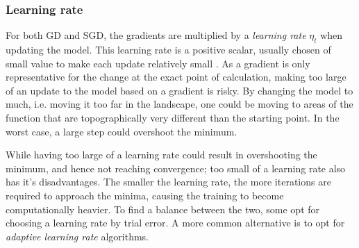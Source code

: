 
\subsubsection{Learning rate}
For both GD and SGD, the gradients are multiplied by a \textit{learning rate} $\eta_t$ when updating the model.
This learning rate is a positive scalar, usually chosen of small value to make each update relatively small \citep[p. 84]{Goodfellow-et-al-2016}.
As a gradient is only representative for the change at the exact point of calculation, making too large of an update to the model based on a gradient is risky. By changing the model to much, i.e. moving it too far in the landscape, one could be moving to areas of the function that are topographically very different than the starting point. In the worst case, a large step could overshoot the minimum.

While having too large of a learning rate could result in overshooting the minimum, and hence not reaching convergence; too small of a learning rate also has it's disadvantages. 
The smaller the learning rate, the more iterations are required to approach the minima, causing the training to become computationally heavier. To find a balance between the two, some opt for choosing a learning rate by trial error.
A more common alternative is to opt for \textit{adaptive learning rate} algorithms.

